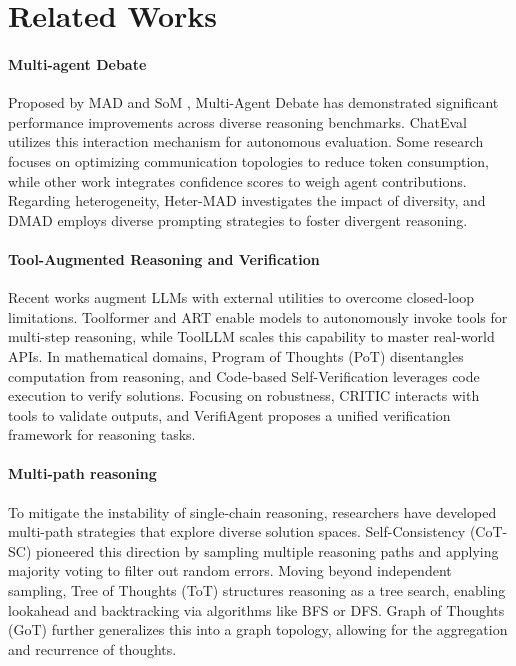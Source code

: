 \section{Related Works}

\paragraph{Multi-agent Debate}

Proposed by MAD \cite{liang2023encouraging} and SoM \cite{du2023improving}, Multi-Agent Debate has demonstrated significant performance improvements across diverse reasoning benchmarks. ChatEval \cite{chan2023chateval} utilizes this interaction mechanism for autonomous evaluation. Some research focuses on optimizing communication topologies \cite{li2024improving} to reduce token consumption, while other work integrates confidence scores \cite{lin2025enhancing} to weigh agent contributions. Regarding heterogeneity, Heter-MAD \cite{zhang2025if} investigates the impact of diversity, and DMAD  \cite{liu2025breaking} employs diverse prompting strategies to foster divergent reasoning.

\paragraph{Tool-Augmented Reasoning and Verification}

Recent works augment LLMs with external utilities to overcome closed-loop limitations. Toolformer \cite{schick2023toolformer} and ART \cite{paranjape2023art} enable models to autonomously invoke tools for multi-step reasoning, while ToolLLM \cite{qin2023toolllm} scales this capability to master real-world APIs. In mathematical domains, Program of Thoughts (PoT) \cite{chen2022program} disentangles computation from reasoning, and Code-based Self-Verification \cite{zhou2023solving} leverages code execution to verify solutions. Focusing on robustness, CRITIC \cite{gou2023critic} interacts with tools to validate outputs, and VerifiAgent \cite{han2025verifiagent} proposes a unified verification framework for reasoning tasks.

\paragraph{Multi-path reasoning}

To mitigate the instability of single-chain reasoning, researchers have developed multi-path strategies that explore diverse solution spaces. Self-Consistency (CoT-SC) \cite{wang2022self} pioneered this direction by sampling multiple reasoning paths and applying majority voting to filter out random errors. Moving beyond independent sampling, Tree of Thoughts (ToT) \cite{yao2023tree} structures reasoning as a tree search, enabling lookahead and backtracking via algorithms like BFS or DFS. Graph of Thoughts (GoT) \cite{besta2024graph} further generalizes this into a graph topology, allowing for the aggregation and recurrence of thoughts.
